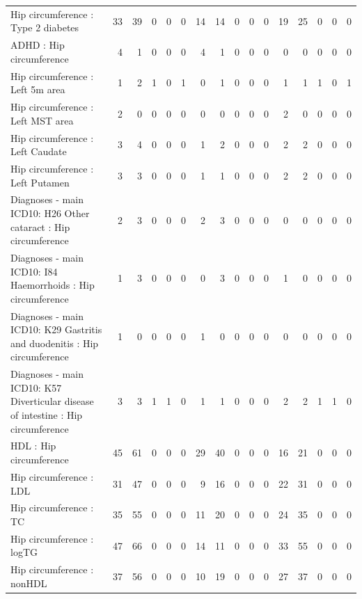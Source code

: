 \begin{table}[ht]
\begin{tabular}{lrrrrrrrrrrrrrrr}
  Hip circumference  : Type 2 diabetes &  33 &  39 &   0 &   0 &   0 &  14 &  14 &   0 &   0 &   0 &  19 &  25 &   0 &   0 &   0 \\ 
  ADHD : Hip circumference  &   4 &   1 &   0 &   0 &   0 &   4 &   1 &   0 &   0 &   0 &   0 &   0 &   0 &   0 &   0 \\ 
  Hip circumference  : Left 5m area &   1 &   2 &   1 &   0 &   1 &   0 &   1 &   0 &   0 &   0 &   1 &   1 &   1 &   0 &   1 \\ 
  Hip circumference  : Left MST area &   2 &   0 &   0 &   0 &   0 &   0 &   0 &   0 &   0 &   0 &   2 &   0 &   0 &   0 &   0 \\ 
  Hip circumference  : Left Caudate &   3 &   4 &   0 &   0 &   0 &   1 &   2 &   0 &   0 &   0 &   2 &   2 &   0 &   0 &   0 \\ 
  Hip circumference  : Left Putamen &   3 &   3 &   0 &   0 &   0 &   1 &   1 &   0 &   0 &   0 &   2 &   2 &   0 &   0 &   0 \\ 
  Diagnoses - main ICD10: H26 Other cataract : Hip circumference  &   2 &   3 &   0 &   0 &   0 &   2 &   3 &   0 &   0 &   0 &   0 &   0 &   0 &   0 &   0 \\ 
  Diagnoses - main ICD10: I84 Haemorrhoids : Hip circumference  &   1 &   3 &   0 &   0 &   0 &   0 &   3 &   0 &   0 &   0 &   1 &   0 &   0 &   0 &   0 \\ 
  Diagnoses - main ICD10: K29 Gastritis and duodenitis : Hip circumference  &   1 &   0 &   0 &   0 &   0 &   1 &   0 &   0 &   0 &   0 &   0 &   0 &   0 &   0 &   0 \\ 
  Diagnoses - main ICD10: K57 Diverticular disease of intestine : Hip circumference  &   3 &   3 &   1 &   1 &   0 &   1 &   1 &   0 &   0 &   0 &   2 &   2 &   1 &   1 &   0 \\ 
  HDL : Hip circumference  &  45 &  61 &   0 &   0 &   0 &  29 &  40 &   0 &   0 &   0 &  16 &  21 &   0 &   0 &   0 \\ 
  Hip circumference  : LDL &  31 &  47 &   0 &   0 &   0 &   9 &  16 &   0 &   0 &   0 &  22 &  31 &   0 &   0 &   0 \\ 
  Hip circumference  : TC &  35 &  55 &   0 &   0 &   0 &  11 &  20 &   0 &   0 &   0 &  24 &  35 &   0 &   0 &   0 \\ 
  Hip circumference  : logTG &  47 &  66 &   0 &   0 &   0 &  14 &  11 &   0 &   0 &   0 &  33 &  55 &   0 &   0 &   0 \\ 
  Hip circumference  : nonHDL &  37 &  56 &   0 &   0 &   0 &  10 &  19 &   0 &   0 &   0 &  27 &  37 &   0 &   0 &   0 \\ 

\end{tabular}
\end{table}
